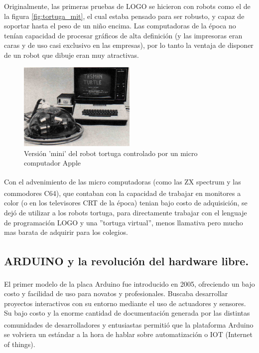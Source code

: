 Originalmente, las primeras pruebas de LOGO se hicieron con robots como el de la figura \ref{fig:tortuga_mit}, el cual estaba pensado para ser robusto, y capaz de soportar hasta el peso de un niño encima. Las computadoras de la época no tenían capacidad de procesar gráficos de alta definición (y las impresoras eran caras y de uso casi exclusivo en las empresas), por lo tanto la ventaja de disponer de un robot que dibuje eran muy atractivas.

\begin{figure}[htb]
  \begin{center}
    \includegraphics[width=0.5\textwidth]{figuras/turtle_with_apple.JPG}
    \caption[Caption for LOF]{Versión 'mini' del robot tortuga controlado por un micro computador Apple}
    
    \label{fig:tortuga_2}
  \end{center}
\end{figure}

Con el advenimiento de las micro computadoras (como las ZX spectrum\textsuperscript{\texttrademark}  y las commodores\textsuperscript{\texttrademark} C64), que contaban con la capacidad de trabajar  en monitores a color (o en los televisores CRT de la época) tenian bajo costo de adquisición, se dejó de utilizar a los robots tortuga, para directamente trabajar con el lenguaje de programación LOGO y una ''tortuga virtual'', menos llamativa pero mucho mas barata de adquirir para los colegios. 

\subsection{ARDUINO\textsuperscript{\texttrademark} y la revolución del hardware libre.} 


El primer modelo de la placa Arduino\textsuperscript{\texttrademark} fue introducido en 2005, ofreciendo un bajo costo y facilidad de uso para novatos y profesionales. Buscaba desarrollar proyectos interactivos con su entorno mediante el uso de actuadores y sensores. Su bajo costo y la enorme cantidad de documentación generada por las distintas comunidades de desarrolladores y entusiastas permitió que la plataforma Arduino\textsuperscript{\texttrademark} se volviera un estándar a la hora de hablar sobre automatización o IOT (Internet of things).


